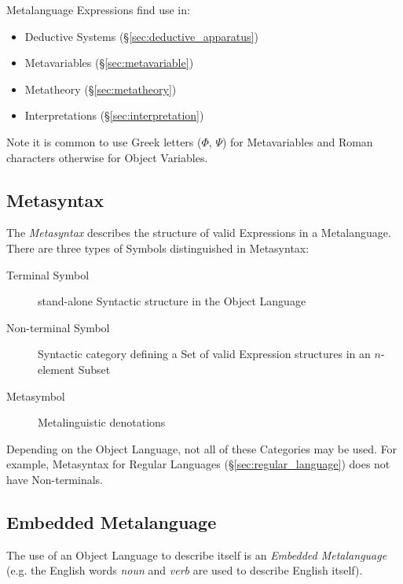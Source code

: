 Metalanguage Expressions find use in:
\begin{itemize}
  \item Deductive Systems (\S\ref{sec:deductive_apparatus})
  \item Metavariables (\S\ref{sec:metavariable})
  \item Metatheory (\S\ref{sec:metatheory})
  \item Interpretations (\S\ref{sec:interpretation})
\end{itemize}

Note it is common to use Greek letters ($\Phi$, $\Psi$) for
Metavariables and Roman characters otherwise for Object Variables.



\subsection{Metasyntax}\label{sec:metasyntax}

The \emph{Metasyntax} describes the structure of valid Expressions in
a Metalanguage. There are three types of Symbols distinguished in
Metasyntax:
\begin{description}
  \item [Terminal Symbol] stand-alone Syntactic structure in the
    Object Language
  \item [Non-terminal Symbol] Syntactic category defining a Set of
    valid Expression structures in an $n$-element Subset
  \item [Metasymbol] Metalinguistic denotations
\end{description}
Depending on the Object Language, not all of these Categories may be
used. For example, Metasyntax for Regular Languages
(\S\ref{sec:regular_language}) does not have Non-terminals.



\subsection{Embedded Metalanguage}\label{sec:embedded_metalanguage}

The use of an Object Language to describe itself is an \emph{Embedded
  Metalanguage} (e.g. the English words \emph{noun} and \emph{verb}
are used to describe English itself).



